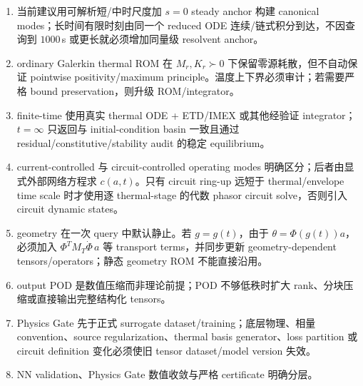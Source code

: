 \begin{enumerate}
  \item 当前建议用可解析短/中时尺度加 $s=0$ steady anchor 构建 canonical modes；长时间有限时刻由同一个 reduced ODE 连续/链式积分到达，不因查询到 $1000\,$s 或更长就必须增加同量级 resolvent anchor。
  \item ordinary Galerkin thermal ROM 在 $M_r,K_r\succ0$ 下保留零源耗散，但不自动保证 pointwise positivity/maximum principle。温度上下界必须审计；若需要严格 bound preservation，则升级 ROM/integrator。
  \item finite-time 使用真实 thermal ODE + ETD/IMEX 或其他经验证 integrator；$t=\infty$ 只返回与 initial-condition basin 一致且通过 residual/constitutive/stability audit 的稳定 equilibrium。
  \item current-controlled 与 circuit-controlled operating modes 明确区分；后者由显式外部网络方程求 $c(a,t)$。只有 circuit ring-up 远短于 thermal/envelope time scale 时才使用逐 thermal-stage 的代数 phasor circuit solve，否则引入 circuit dynamic states。
  \item geometry 在一次 query 中默认静止。若 $g=g(t)$，由于 $\theta=\Phi(g(t))a$，必须加入 $\Phi^TM_T\dot\Phi\,a$ 等 transport terms，并同步更新 geometry-dependent tensors/operators；静态 geometry ROM 不能直接沿用。
  \item output POD 是数值压缩而非理论前提；POD 不够低秩时扩大 rank、分块压缩或直接输出完整结构化 tensors。
  \item Physics Gate 先于正式 surrogate dataset/training；底层物理、相量 convention、source regularization、thermal basis generator、loss partition 或 circuit definition 变化必须使旧 tensor dataset/model version 失效。
  \item NN validation、Physics Gate 数值收敛与严格 certificate 明确分层。
\end{enumerate}


